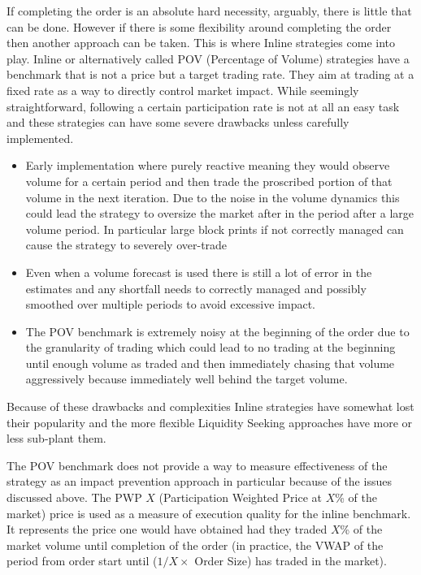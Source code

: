 If completing the order is an absolute hard necessity, arguably, there is little that can be done. However if there is some flexibility around completing the order then another approach can be taken. This is where Inline strategies come into play. Inline or alternatively called POV (Percentage of Volume) strategies have a benchmark that is not a price but a target trading rate. They aim at trading at a fixed rate as a way to directly control market impact. While seemingly straightforward, following a certain participation rate is not at all an easy task and these strategies can have some severe drawbacks unless carefully implemented.


\begin{itemize}
\item Early implementation where purely reactive meaning they would observe volume for a certain period and then trade the proscribed portion of that volume in the next iteration. Due to the noise in the volume dynamics this could lead the strategy to oversize the market after in the period after a large volume period. In particular large block prints if not correctly managed can cause the strategy to severely over-trade

\item Even when a volume forecast is used there is still a lot of error in the estimates and any shortfall needs to correctly managed and possibly smoothed over multiple periods to avoid excessive impact.

\item The POV benchmark is extremely noisy at the beginning of the order due to the granularity of trading which could lead to no trading at the beginning until enough volume as traded and then immediately chasing that volume aggressively because immediately well behind the target volume.
\end{itemize}

Because of these drawbacks and complexities Inline strategies have somewhat lost their popularity and the more flexible Liquidity Seeking approaches  have more or less sub-plant them.

The POV benchmark does not provide a way to measure effectiveness of the strategy as an impact prevention approach in particular because of the issues discussed above. The PWP $X$ (Participation Weighted Price at $X$\% of the market) price is used as a measure of execution quality for the inline benchmark. It represents the price one would have obtained had they traded $X$\% of the market volume until completion of the order (in practice, the VWAP of the period from order start until ($1/X \times$ Order Size) has traded in the market).

